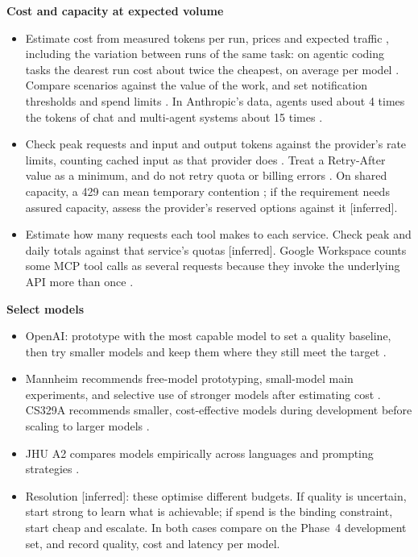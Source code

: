 \documentclass[10pt]{article}
\newcommand{\inferred}{\textsf{\small[inferred]}}
\begin{document}
\textbf{Cost and capacity at expected volume}
\begin{itemize}
\item Estimate cost from measured tokens per run, prices and expected traffic \cite[``Managing costs'']{oaiprod}, including the variation between runs of the same task: on agentic coding tasks the dearest run cost about twice the cheapest, on average per model \cite[Fig.~2]{bai}. Compare scenarios against the value of the work, and set notification thresholds and spend limits \cite[``Managing billing limits'']{oaiprod}. In Anthropic's data, agents used about 4 times the tokens of chat and multi-agent systems about 15 times \cite[``Benefits of a multi-agent system'']{anthmulti}.
\item Check peak requests and input and output tokens against the provider's rate limits, counting cached input as that provider does \cite[``Cache-aware ITPM'']{claudelimits}. Treat a Retry-After value as a minimum, and do not retry quota or billing errors \cite[``Error mitigation'', ``Retrying with exponential backoff'']{oailimits}. On shared capacity, a 429 can mean temporary contention \cite[``Resource Exhausted (429) errors'']{vertexdsq}; if the requirement needs assured capacity, assess the provider's reserved options against it \inferred.
\item Estimate how many requests each tool makes to each service. Check peak and daily totals against that service's quotas \inferred{}. Google Workspace counts some MCP tool calls as several requests because they invoke the underlying API more than once \cite[``Tier and billing policies'']{gwsquota}.
\end{itemize}

\textbf{Select models}
\begin{itemize}
\item OpenAI: prototype with the most capable model to set a quality baseline, then try smaller models and keep them where they still meet the target \cite[p.~8]{openai}.
\item Mannheim recommends free-model prototyping, small-model main experiments, and selective use of stronger models after estimating cost \cite[slide~28]{mannheim}. CS329A recommends smaller, cost-effective models during development before scaling to larger models \cite[``API Configuration and Setup'']{cs329a}.
\item JHU A2 compares models empirically across languages and prompting strategies \cite{jhua2}.
\item Resolution \inferred: these optimise different budgets. If quality is uncertain, start strong to learn what is achievable; if spend is the binding constraint, start cheap and escalate. In both cases compare on the Phase~4 development set, and record quality, cost and latency per model.
\end{itemize}
\end{document}
